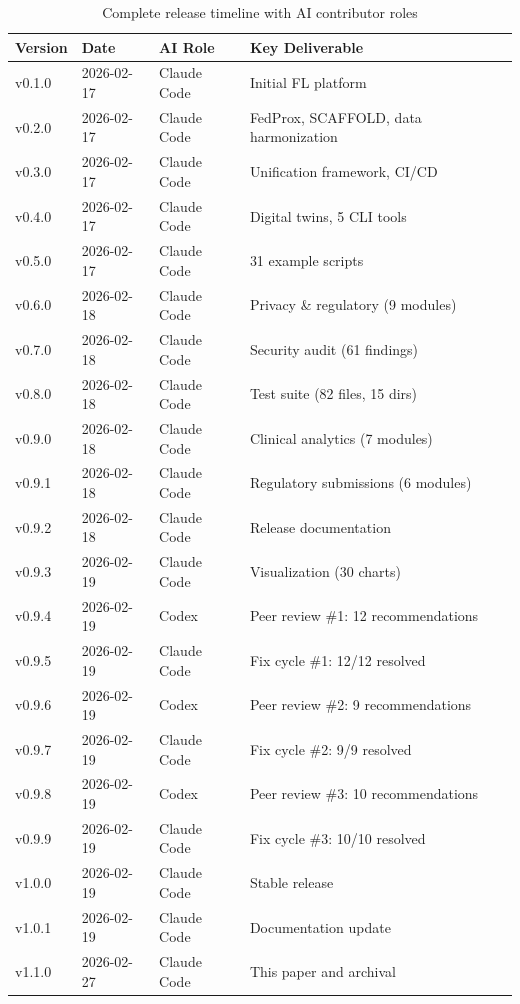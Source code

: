 \documentclass[10pt]{article}
\begin{document}
\begin{table}[H]
\centering
\caption{Complete release timeline with AI contributor roles}
\label{tab:timeline}
\small
\begin{tabular}{@{}llll@{}}
\toprule
\textbf{Version} & \textbf{Date} & \textbf{AI Role} & \textbf{Key Deliverable} \\
\midrule
v0.1.0 & 2026-02-17 & Claude Code & Initial FL platform \\
v0.2.0 & 2026-02-17 & Claude Code & FedProx, SCAFFOLD, data harmonization \\
v0.3.0 & 2026-02-17 & Claude Code & Unification framework, CI/CD \\
v0.4.0 & 2026-02-17 & Claude Code & Digital twins, 5 CLI tools \\
v0.5.0 & 2026-02-17 & Claude Code & 31 example scripts \\
v0.6.0 & 2026-02-18 & Claude Code & Privacy \& regulatory (9 modules) \\
v0.7.0 & 2026-02-18 & Claude Code & Security audit (61 findings) \\
v0.8.0 & 2026-02-18 & Claude Code & Test suite (82 files, 15 dirs) \\
v0.9.0 & 2026-02-18 & Claude Code & Clinical analytics (7 modules) \\
v0.9.1 & 2026-02-18 & Claude Code & Regulatory submissions (6 modules) \\
v0.9.2 & 2026-02-18 & Claude Code & Release documentation \\
v0.9.3 & 2026-02-19 & Claude Code & Visualization (30 charts) \\
v0.9.4 & 2026-02-19 & Codex & Peer review \#1: 12 recommendations \\
v0.9.5 & 2026-02-19 & Claude Code & Fix cycle \#1: 12/12 resolved \\
v0.9.6 & 2026-02-19 & Codex & Peer review \#2: 9 recommendations \\
v0.9.7 & 2026-02-19 & Claude Code & Fix cycle \#2: 9/9 resolved \\
v0.9.8 & 2026-02-19 & Codex & Peer review \#3: 10 recommendations \\
v0.9.9 & 2026-02-19 & Claude Code & Fix cycle \#3: 10/10 resolved \\
v1.0.0 & 2026-02-19 & Claude Code & Stable release \\
v1.0.1 & 2026-02-19 & Claude Code & Documentation update \\
v1.1.0 & 2026-02-27 & Claude Code & This paper and archival \\
\bottomrule
\end{tabular}
\end{table}
\end{document}
